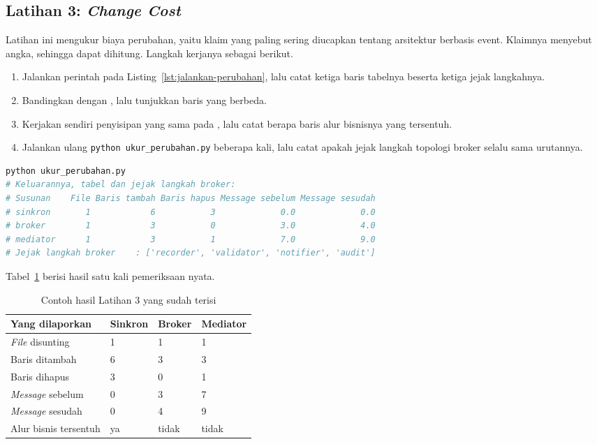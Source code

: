 \subsection*{Latihan 3: \textit{Change Cost}}

Latihan ini mengukur biaya perubahan, yaitu klaim yang paling sering diucapkan
tentang arsitektur berbasis event. Klaimnya menyebut angka, sehingga dapat
dihitung. Langkah kerjanya sebagai berikut.

\begin{enumerate}
  \item Jalankan perintah pada Listing~\ref{lst:jalankan-perubahan}, lalu
    catat ketiga baris tabelnya beserta ketiga jejak langkahnya.
  \item Bandingkan  dengan
    , lalu tunjukkan baris yang
    berbeda.
  \item Kerjakan sendiri penyisipan yang sama pada
    , lalu catat berapa baris alur
    bisnisnya yang tersentuh.
  \item Jalankan ulang \texttt{python ukur\_perubahan.py} beberapa kali, lalu
    catat apakah jejak langkah topologi broker selalu sama urutannya.
\end{enumerate}

\begin{lstlisting}[language=bash, caption={Mengukur \textit{change cost},
  skrip tersedia di \berkas{sources/chapter09/ukur_perubahan.py}},
  label=lst:jalankan-perubahan]
python ukur_perubahan.py
# Keluarannya, tabel dan jejak langkah broker:
# Susunan    File Baris tambah Baris hapus Message sebelum Message sesudah
# sinkron       1            6           3             0.0             0.0
# broker        1            3           0             3.0             4.0
# mediator      1            3           1             7.0             9.0
# Jejak langkah broker    : ['recorder', 'validator', 'notifier', 'audit']
\end{lstlisting}

Tabel~\ref{tab:lat3event-contoh} berisi hasil satu kali pemeriksaan nyata.

\begin{table}[htbp]
  \centering
  \caption{Contoh hasil Latihan 3 yang sudah terisi}
  \label{tab:lat3event-contoh}
  \begin{tabularx}{\textwidth}{|X|l|l|l|}
    \hline
    \textbf{Yang dilaporkan} & \textbf{Sinkron} & \textbf{Broker} & \textbf{Mediator} \\
    \hline
    \textit{File} disunting & 1 & 1 & 1 \\
    \hline
    Baris ditambah & 6 & 3 & 3 \\
    \hline
    Baris dihapus & 3 & 0 & 1 \\
    \hline
    \textit{Message} sebelum & 0 & 3 & 7 \\
    \hline
    \textit{Message} sesudah & 0 & 4 & 9 \\
    \hline
    Alur bisnis tersentuh & ya & tidak & tidak \\
    \hline
  \end{tabularx}
\end{table}

